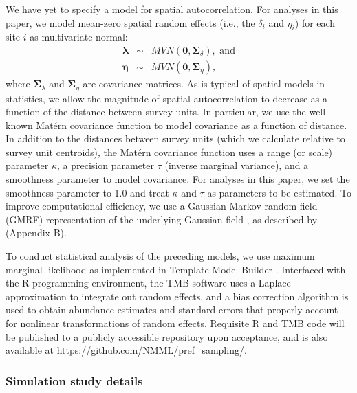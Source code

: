 \documentclass[times,mee,doublespace,]{besauth2}
\begin{document}
\begin{flushleft}
\hspace{0.5in} We have yet to specify a model for spatial autocorrelation.  For analyses in this paper, we model mean-zero spatial random effects (i.e., the $\delta_i$ and $\eta_i$) for each site $i$ as multivariate normal:
\begin{eqnarray*}
  \boldsymbol{\lambda} & \sim & MVN(\textbf{0},\boldsymbol{\Sigma}_{\delta}), \text{ and} \\
  \boldsymbol{\eta} & \sim & MVN(\textbf{0},\boldsymbol{\Sigma}_{\eta}),
\end{eqnarray*}
where $\boldsymbol{\Sigma}_{\lambda}$ and $\boldsymbol{\Sigma}_{\eta}$ are covariance matrices.  As is typical of spatial models in statistics, we allow the magnitude of spatial autocorrelation to decrease as a function of the distance between survey units.  In particular, we use the well known Mat\'{e}rn covariance function to model covariance as a function of distance.  In addition to the distances between survey units (which we calculate relative to survey unit centroids), the Mat\'{e}rn covariance function uses a range (or scale) parameter $\kappa$, a precision parameter $\tau$ (inverse marginal variance), and a smoothness parameter to model covariance.  For analyses in this paper, we set the smoothness parameter to 1.0 and treat $\kappa$ and $\tau$ as parameters to be estimated.  To improve computational efficiency, we use a Gaussian Markov random field (GMRF) representation of the underlying Gaussian field \citep{LindgrenEtAl2011}, as described by \citet{ThorsonEtAl2015} (Appendix B).

\hspace{0.5in} To conduct statistical analysis of the preceding models, we use maximum marginal likelihood as implemented in Template Model Builder \citep[TMB; ][]{KristensenEtAl2015}. Interfaced with the R programming environment, the TMB software uses a Laplace approximation to integrate out random effects, and a bias correction algorithm \citep{TierneyEtAl1989,ThorsonKristensenInPress} is used to obtain abundance estimates and standard errors that properly account for nonlinear transformations of random effects.  Requisite R and TMB code will be published to a publicly accessible repository upon acceptance, and is also available at \url{https://github.com/NMML/pref_sampling/}.

\subsubsection*{Simulation study details}


\end{flushleft}
\end{document}
